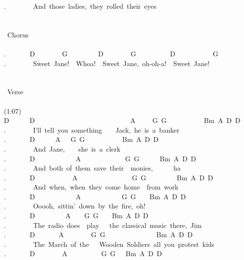 {.\ \ \ \ \ \ \ \ And\ those\ ladies,\ they\ rolled\ their\ eyes\\
\\
\\
\lbrack\ Chorus\rbrack\\
\\
.\ \ \ \ \ \ \ D\ \ \ \ \ \ \ \ G\ \ \ \ \ \ \ \ \ D\ \ \ \ \ \ \ \ G\ \ \ \ \ \ \ \ \ \ D\ \ \ \ \ \ \ \ \ \ \ G\\
.\ \ \ \ \ \ \ \ Sweet\ Jane!\ \ Whoa!\ \ Sweet\ Jane,\ oh-oh-a!\ \ Sweet\ Jane!\\
\\
\\
\lbrack\ Verse\rbrack\\
\\
(1:07)\\
D\ \ \ \ \ \ D\ \ \ \ \ \ \ \ \ \ \ \ \ \ \ \ \ \ \ \ \ \ \ \ \ \ \ \ A\ \ \ \ \ G\ G\ \ \ \ \ \ \ \ \ \ \ Bm\ A\ D\ D\\
.\ \ \ \ \ \ \ \ I'll\ tell\ you\ something\ \ \ \ Jack,\ he\ is\ a\ banker\\
.\ \ \ \ \ \ \ D\ \ \ \ \ \ A\ \ \ G\ G\ \ \ \ \ \ \ \ \ \ \ Bm\ A\ D\ D\\
.\ \ \ \ \ \ \ \ And\ Jane,\ \ \ \ she\ is\ a\ clerk\\
.\ \ \ \ \ \ \ D\ \ \ \ \ \ \ \ \ \ \ \ A\ \ \ \ \ \ \ \ \ \ \ \ \ G\ G\ \ \ \ \ \ Bm\ A\ D\ D\\
.\ \ \ \ \ \ \ \ And\ both\ of\ them\ save\ their\ \ monies,\ \ \ \ \ \ ha\\
.\ \ \ \ \ \ \ D\ \ \ \ \ \ \ \ \ \ \ A\ \ \ \ \ \ \ \ \ \ \ \ \ \ \ \ G\ G\ \ \ \ \ \ \ \ \ Bm\ A\ D\ D\\
.\ \ \ \ \ \ \ \ And\ when,\ when\ they\ come\ home\ \ from\ work\\
.\ \ \ \ \ \ \ D\ \ \ \ \ \ \ \ \ \ \ \ A\ \ \ \ \ \ \ \ \ \ \ \ G\ G\ \ \ \ Bm\ A\ D\ D\\
.\ \ \ \ \ \ \ \ Ooooh,\ sittin'\ down\ by\ the\ fire,\ oh!\\
.\ \ \ \ \ \ \ D\ \ \ \ \ \ \ \ \ A\ \ \ \ G\ G\ \ \ \ Bm\ A\ D\ D\\
.\ \ \ \ \ \ \ \ The\ radio\ does\ \ play\ \ \ the\ classical\ music\ there,\ Jim\\
.\ \ \ \ \ \ \ D\ \ \ \ \ \ \ A\ \ \ \ \ \ \ \ G\ G\ \ \ \ \ \ \ \ \ \ \ \ \ \ \ Bm\ A\ D\ D\\
.\ \ \ \ \ \ \ \ \;The\ March\ of\ the\ \ \ Wooden\ Soldiers\;\ all\ you\ protest\ kids\\
.\ \ \ \ \ \ \ D\ \ \ \ \ \ \ \ A\ \ \ \ \ \ \ \ \ \ G\ G\ \ \ Bm\ A\ D\ D\\
}
